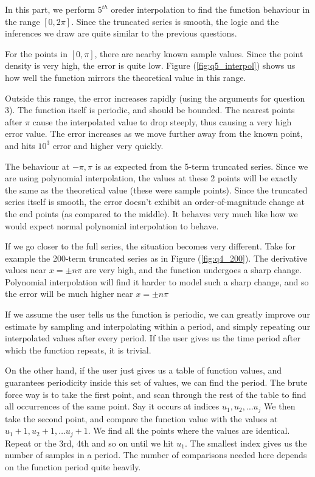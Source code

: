 \documentclass[11pt]{article}
\begin{document}
In this part, we perform $5^{th}$ oreder interpolation to find the function behaviour in the range $[0,2\pi]$. Since the truncated series is smooth, the logic and the inferences we draw are quite similar to the previous questions. \

For the points in $[0,\pi]$, there are nearby known sample values. Since the  point density is very high, the error is quite low. Figure (\ref{fig:q5_interpol}) shows us how well the function mirrors the theoretical value in this range. 

Outside this range, the error increases rapidly (using the arguments for question 3). The function itself is periodic, and should be bounded. The nearest points after $\pi$ cause the interpolated value to drop steeply, thus causing a very high error value. The error increases as we move further away from the known point, and hits $10^{3}$ error and higher very quickly. 

The behaviour at $-\pi,\pi$ is as expected from the 5-term truncated series. Since we are using polynomial interpolation, the values at these 2 points will be exactly the same as the theoretical value (these were sample points). Since the truncated series itself is smooth, the error doesn't exhibit an order-of-magnitude change at the end points (as compared to the middle). It behaves very much like how we would expect normal polynomial interpolation to behave.

If we go closer to the full series, the situation becomes very different. Take for example the 200-term truncated series as in Figure (\ref{fig:q4_200}). The derivative values near $x=\pm n\pi$ are very high, and the function undergoes a sharp change. Polynomial interpolation will find it harder to model such a sharp change, and so the error will be much higher near $x=\pm n\pi$

If we assume the user tells us the function is periodic, we can greatly improve our estimate by sampling and interpolating within a period, and simply repeating our interpolated values after every period. If the user gives us the time period after which the function repeats, it is trivial. 

On the other hand, if the user just gives us a table of function values, and guarantees periodicity inside this set of values, we can find the period. The brute force way is to take the first point, and scan through the rest of the table to find all occurrences of the same point. Say it occurs at indices ${u_1,u_2,\ldots u_j}$ We then take the second point, and compare the function value with the values at ${u_1+1,u_2+1,\ldots u_j+1}$. We find all the points where the values are identical. Repeat or the 3rd, 4th and so on until we hit $u_1$. The smallest index gives us the number of samples in a period. The number of comparisons needed here depends on the function period quite heavily.
\end{document}
